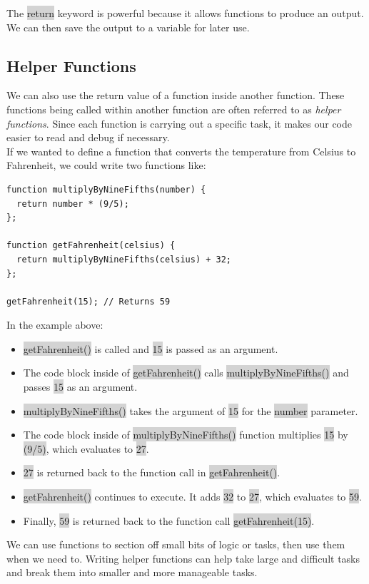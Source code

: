 \documentclass[11pt]{article}
\begin{document}
The \colorbox{lightgray}{return} keyword is powerful because it allows functions to produce an output. We can then save the output to a variable for later use.

\subsection{Helper Functions}
We can also use the return value of a function inside another function. These functions being called within another function are often referred to as \textit{helper functions}. Since each function is carrying out a specific task, it makes our code easier to read and debug if necessary. \\
\newline
If we wanted to define a function that converts the temperature from Celsius to Fahrenheit, we could write two functions like:
\begin{lstlisting}
function multiplyByNineFifths(number) {
  return number * (9/5);
};

function getFahrenheit(celsius) {
  return multiplyByNineFifths(celsius) + 32;
};

getFahrenheit(15); // Returns 59
\end{lstlisting}

In the example above: 
\begin{itemize}[leftmargin = *]
\item \colorbox{lightgray}{getFahrenheit()} is called and \colorbox{lightgray}{15} is passed as an argument.
\item The code block inside of \colorbox{lightgray}{getFahrenheit()} calls \colorbox{lightgray}{multiplyByNineFifths()} and passes \colorbox{lightgray}{15} as an argument.
\item \colorbox{lightgray}{multiplyByNineFifths()} takes the argument of \colorbox{lightgray}{15} for the \colorbox{lightgray}{number} parameter.
\item The code block inside of \colorbox{lightgray}{multiplyByNineFifths()} function multiplies \colorbox{lightgray}{15} by \colorbox{lightgray}{(9/5)}, which evaluates to \colorbox{lightgray}{27}.
\item \colorbox{lightgray}{27} is returned back to the function call in \colorbox{lightgray}{getFahrenheit()}.
\item \colorbox{lightgray}{getFahrenheit()} continues to execute. It adds \colorbox{lightgray}{32} to \colorbox{lightgray}{27}, which evaluates to \colorbox{lightgray}{59}.
\item Finally, \colorbox{lightgray}{59} is returned back to the function call \colorbox{lightgray}{getFahrenheit(15)}.
\end{itemize}
We can use functions to section off small bits of logic or tasks, then use them when we need to. Writing helper functions can help take large and difficult tasks and break them into smaller and more manageable tasks.
\newpage
\end{document}
